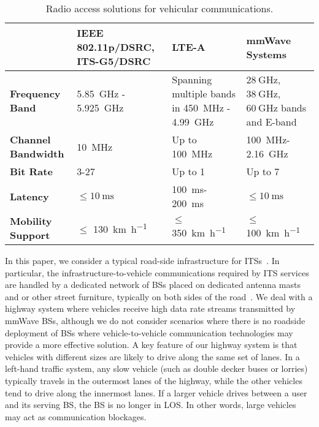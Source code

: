 \documentclass[10pt,journal,a4paper]{IEEEtran}
\begin{document}
\begin{table}[t]
\renewcommand{\arraystretch}{1.3}
\centering
    \caption{Radio access solutions for vehicular communications.}
{\scriptsize\begin{tabular}{|M{1.2cm}|M{2.3cm}|M{1.8cm}|M{1.8cm}|}
     & \textbf{IEEE 802.11p/DSRC, ITS-G5/DSRC}~\cite{5771027} & {\textbf{LTE-A}~\cite{6515060}} & {\textbf{mmWave Systems}~\cite{C0}} \\ \hline
	\textbf{Frequency Band} & \SI{5.85}{\giga\hertz} - \SI{5.925}{\giga\hertz} & Spanning multiple bands in \SI{450}{\mega\hertz} - \SI{4.99}{\giga\hertz} & $\SI{28}{\giga\hertz}$, $\SI{38}{\giga\hertz}$, $\SI{60}{\giga\hertz}$ bands and E-band   \\ \hline
	\textbf{Channel Bandwidth} & \SI{10}{\mega\hertz} &  Up to \SI{100}{\mega\hertz} & \SI{100}{\mega\hertz}-\SI{2.16}{\giga\hertz} \\ \hline 
	\textbf{Bit Rate} & \SI{3}{\Mbps}-\SI{27}{\Mbps} & Up to \SI{1}{\Gbps} & Up to \SI{7}{\Gbps} \\ \hline
	\textbf{Latency} & $\leq \SI{10}{\milli\second}$ & \SI{100}{\milli\second}-\SI{200}{\milli\second} & $\leq \SI{10}{\milli\second}$ \\ \hline 
	\textbf{Mobility Support} & $\leq$ \SI{130}{\kilo\meter\per\hour} & $\leq$ \SI{350}{\kilo\meter\per\hour} & $\leq$ \SI{100}{\kilo\meter\per\hour} \\ \hline
	\end{tabular}}
    \label{tab:technology_comparison}
\end{table}

In this paper, we consider a typical road-side infrastructure for ITSs~\cite{hasan2012intelligent}. {In particular, the infrastructure-to-vehicle communications required by ITS services are handled by a dedicated network of BSs placed on dedicated antenna masts and or other street furniture, typically on both sides of the road~\cite{citeulike:3331930,Trullols2010432}.} We deal with a highway system where vehicles receive high data rate streams transmitted by mmWave BSs, although we do not consider scenarios where there is no roadside deployment of BSs where vehicle-to-vehicle communication technologies may provide a more effective solution.
A key feature of our highway system is that vehicles with different sizes are likely to drive along the same set of lanes. In a left-hand traffic system, any slow vehicle (such as double decker buses or lorries) typically travels in the outermost lanes of the highway, while the other vehicles tend to drive along the innermost lanes. If a larger vehicle drives between a user and its serving BS, the BS is no longer in LOS. In other words, large vehicles may act as communication blockages.
\end{document}
